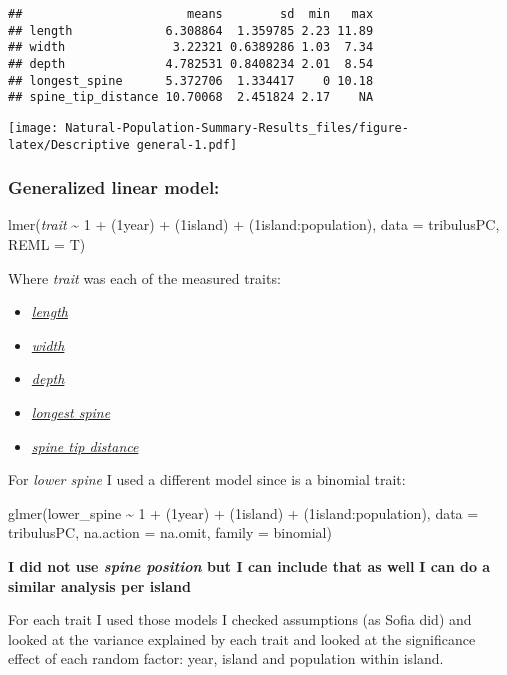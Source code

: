 \documentclass[
]{article}
\providecommand{\tightlist}{%
  \setlength{\itemsep}{0pt}\setlength{\parskip}{0pt}}
\begin{document}
\begin{verbatim}
##                       means        sd  min   max
## length             6.308864  1.359785 2.23 11.89
## width               3.22321 0.6389286 1.03  7.34
## depth              4.782531 0.8408234 2.01  8.54
## longest_spine      5.372706  1.334417    0 10.18
## spine_tip_distance 10.70068  2.451824 2.17    NA
\end{verbatim}

\texttt{[image: Natural-Population-Summary-Results\_files/figure-latex/Descriptive general-1.pdf]}

\hypertarget{generalized-linear-model}{%
\subsubsection{Generalized linear
model:}\label{generalized-linear-model}}

lmer(\emph{trait} \textasciitilde{} 1 + (1\textbar year) +
(1\textbar island) + (1\textbar island:population), data = tribulusPC,
REML = T)

Where \emph{trait} was each of the measured traits:

\begin{itemize}
\tightlist
\item
  \protect\hyperlink{summary-results-length}{\emph{length}}
\item
  \protect\hyperlink{summary-results-width}{\emph{width}}
\item
  \protect\hyperlink{summary-results-depth}{\emph{depth}}
\item
  \protect\hyperlink{summary-results-longest-spine}{\emph{longest
  spine}}
\item
  \protect\hyperlink{summary-results-spine-tip-tistance}{\emph{spine tip
  distance}}
\end{itemize}

For \emph{lower spine} I used a different model since is a binomial
trait:

glmer(lower\_spine \textasciitilde{} 1 + (1\textbar year) +
(1\textbar island) + (1\textbar island:population), data = tribulusPC,
na.action = na.omit, family = binomial)

\textbf{I did not use \emph{spine position} but I can include that as
well} \textbf{I can do a similar analysis per island}

For each trait I used those models I checked assumptions (as Sofia did)
and looked at the variance explained by each trait and looked at the
significance effect of each random factor: year, island and population
within island.
\end{document}
